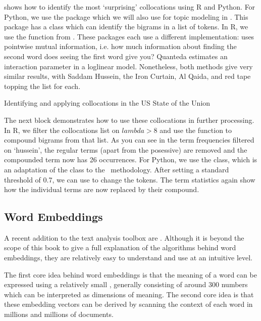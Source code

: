  shows how to identify the most `surprising' collocations using R and Python.
For Python, we use the  package which we will also use for topic modeling in .
This package has a  class which can identify the bigrams in a list of tokens.
In R, we use the  function from \quanteda.
These packages each use a different implementation:  uses pointwise mutual information, i.e.
how much information about finding the second word does seeing the first word give you?
Quanteda estimates an interaction parameter in a loglinear model.
Nonetheless, both methods give very similar results, with Saddam Hussein, the Iron Curtain, Al Qaida, and red tape topping the list for each.


\begin{ccsexample}
\caption{Identifying and applying collocations in the US State of the Union}\label{ex:colloc}
\end{ccsexample}


The next block demonstrates how to use these collocations in further processing.
In R, we filter the collocations list on $lambda>8$ and use the  function to compound bigrams from that list.
As you can see in the term frequencies filtered on `hussein', the regular terms (apart from the posessive) are removed and the compounded term now has 26 occurrences.
For Python, we use the  class, which is an adaptation of the  class to the \sklearn\ methodology.
After setting a standard threshold of 0.7, we can use  to change the tokens.
The term statistics again show how the individual terms are now replaced by their compound. 


\subsection{Word Embeddings}

A recent addition to the text analysis toolbox are .
Although it is beyond the scope of this book to give a full explanation of the algorithms behind word embeddings,
they are relatively easy to understand and use at an intuitive level.

The first core idea behind word embeddings is that the meaning of a word can be expressed using a relatively small , generally consisting of around 300 numbers which can be interpreted as dimensions of meaning.
The second core idea is that these embedding vectors can be derived by scanning the context of each word in millions and millions of documents.


